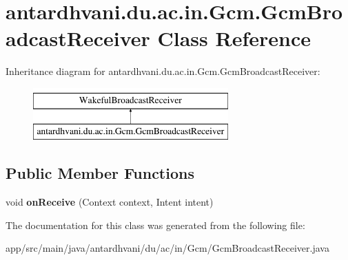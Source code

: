 \hypertarget{classantardhvani_1_1du_1_1ac_1_1in_1_1_gcm_1_1_gcm_broadcast_receiver}{}\section{antardhvani.\+du.\+ac.\+in.\+Gcm.\+Gcm\+Broadcast\+Receiver Class Reference}
\label{classantardhvani_1_1du_1_1ac_1_1in_1_1_gcm_1_1_gcm_broadcast_receiver}
Inheritance diagram for antardhvani.\+du.\+ac.\+in.\+Gcm.\+Gcm\+Broadcast\+Receiver\+:\begin{figure}[H]
\begin{center}
\leavevmode
\includegraphics[height=2.000000cm]{classantardhvani_1_1du_1_1ac_1_1in_1_1_gcm_1_1_gcm_broadcast_receiver}
\end{center}
\end{figure}
\subsection*{Public Member Functions}
\begin{DoxyCompactItemize}
\item 
\hypertarget{classantardhvani_1_1du_1_1ac_1_1in_1_1_gcm_1_1_gcm_broadcast_receiver_aa9eca059ba8ec2313d777fd9b5abc1ab}{}void {\bfseries on\+Receive} (Context context, Intent intent)\label{classantardhvani_1_1du_1_1ac_1_1in_1_1_gcm_1_1_gcm_broadcast_receiver_aa9eca059ba8ec2313d777fd9b5abc1ab}

\end{DoxyCompactItemize}


The documentation for this class was generated from the following file\+:\begin{DoxyCompactItemize}
\item 
app/src/main/java/antardhvani/du/ac/in/\+Gcm/Gcm\+Broadcast\+Receiver.\+java\end{DoxyCompactItemize}

